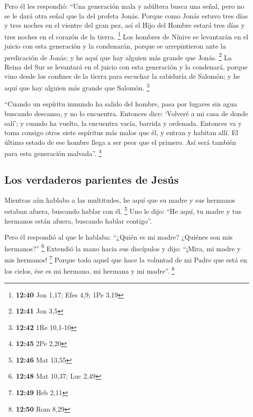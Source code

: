  Pero él les respondió: ``Una generación mala y adúltera
busca una señal, pero no se le dará otra señal que la del profeta Jonás.
 Porque como Jonás estuvo tres días y tres noches en el
vientre del gran pez, así el Hijo del Hombre estará tres días y tres
noches en el corazón de la tierra. \footnote{\textbf{12:40} Jon 1,17;
  Efes 4,9; 1Pe 3,19}  Los hombres de Nínive se
levantarán en el juicio con esta generación y la condenarán, porque se
arrepintieron ante la predicación de Jonás; y he aquí que hay alguien
más grande que Jonás. \footnote{\textbf{12:41} Jon 3,5} 
La Reina del Sur se levantará en el juicio con esta generación y la
condenará, porque vino desde los confines de la tierra para escuchar la
sabiduría de Salomón; y he aquí que hay alguien más grande que Salomón.
\footnote{\textbf{12:42} 1Re 10,1-10}

 ``Cuando un espíritu inmundo ha salido del hombre, pasa
por lugares sin agua buscando descanso, y no lo encuentra.
 Entonces dice: `Volveré a mi casa de donde salí'; y
cuando ha vuelto, la encuentra vacía, barrida y ordenada.
 Entonces va y toma consigo otros siete espíritus más
malos que él, y entran y habitan allí. El último estado de ese hombre
llega a ser peor que el primero. Así será también para esta generación
malvada''. \footnote{\textbf{12:45} 2Pe 2,20}

\hypertarget{los-verdaderos-parientes-de-jesuxfas}{%
\subsection{Los verdaderos parientes de
Jesús}\label{los-verdaderos-parientes-de-jesuxfas}}

 Mientras aún hablaba a las multitudes, he aquí que su
madre y sus hermanos estaban afuera, buscando hablar con él. \footnote{\textbf{12:46}
  Mat 13,55}  Uno le dijo: ``He aquí, tu madre y tus
hermanos están afuera, buscando hablar contigo''.

 Pero él respondió al que le hablaba: ``¿Quién es mi
madre? ¿Quiénes son mis hermanos?'' \footnote{\textbf{12:48} Mat 10,37;
  Luc 2,49}  Extendió la mano hacia sus discípulos y
dijo: ``¡Mira, mi madre y mis hermanos! \footnote{\textbf{12:49} Heb
  2,11}  Porque todo aquel que hace la voluntad de mi
Padre que está en los cielos, ése es mi hermano, mi hermana y mi
madre''. \footnote{\textbf{12:50} Rom 8,29}


